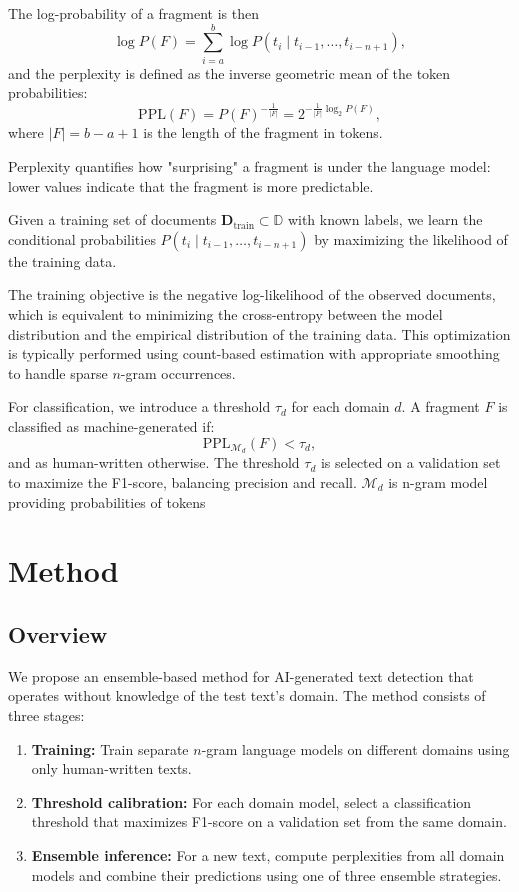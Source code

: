 \documentclass{article}
\begin{document}
The log-probability of a fragment is then
\[
\log P(F) = \sum_{i=a}^{b} \log P(t_i \mid t_{i-1}, \dots, t_{i-n+1}),
\]
and the perplexity is defined as the inverse geometric mean of the token probabilities:
\[
\text{PPL}(F) = P(F)^{-\frac{1}{|F|}} = 2^{-\frac{1}{|F|}\log_2 P(F)},
\]
where $|F| = b-a+1$ is the length of the fragment in tokens.

Perplexity quantifies how "surprising" a fragment is under the language model: lower values indicate that the fragment is more predictable.

Given a training set of documents $\mathbf{D}_{\text{train}} \subset \mathbb{D}$ with known labels, we learn the conditional probabilities $P(t_i \mid t_{i-1}, \dots, t_{i-n+1})$ by maximizing the likelihood of the training data.

The training objective is the negative log-likelihood of the observed documents, which is equivalent to minimizing the cross-entropy between the model distribution and the empirical distribution of the training data. This optimization is typically performed using count-based estimation with appropriate smoothing to handle sparse $n$-gram occurrences.

For classification, we introduce a threshold $\tau_d$ for each domain $d$. A fragment $F$ is classified as machine-generated if:
\[
\text{PPL}_{\mathcal{M}_d}(F) < \tau_d, 
\]
and as human-written otherwise. The threshold $\tau_d$ is selected on a validation set to maximize the F1-score, balancing precision and recall.
$\mathcal{M}_d$ is n-gram model providing probabilities of tokens



\section{Method}\label{sec:method}

\subsection{Overview}

We propose an ensemble-based method for AI-generated text detection that operates without knowledge of the test text's domain. The method consists of three stages:

\begin{enumerate}
    \item \textbf{Training:} Train separate $n$-gram language models on different domains using only human-written texts.
    \item \textbf{Threshold calibration:} For each domain model, select a classification threshold that maximizes F1-score on a validation set from the same domain.
    \item \textbf{Ensemble inference:} For a new text, compute perplexities from all domain models and combine their predictions using one of three ensemble strategies.
\end{enumerate}
\end{document}
